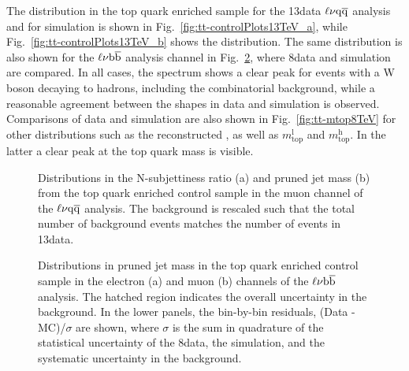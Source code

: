 The \mJ distribution in the top quark enriched sample for the 13\TeV data $\ell\nu\mathrm{q}\overline{\mathrm{q}}$ analysis and for simulation is shown in Fig.~\ref{fig:tt-controlPlots13TeV_a}, while Fig.~\ref{fig:tt-controlPlots13TeV_b} shows the \nsubj distribution.
The same distribution is also shown for the $\ell\nu{\mathrm{b}\overline{\mathrm{b}}}$ analysis channel in Fig.~\ref{fig:tt-controlPlots8TeV}, where 8\TeV data and simulation are compared.
In all cases, the \mJ spectrum shows a clear peak for events with a W boson decaying to hadrons, including the combinatorial background, while a reasonable agreement between the shapes in data and simulation is observed.
Comparisons of data and simulation are also shown in Fig.~\ref{fig:tt-mtop8TeV} for other distributions such as the reconstructed \mlvj, as well as $m_\mathrm{top}^\mathrm{l}$ and $m_\mathrm{top}^\mathrm{h}$.
In the latter a clear peak at the top quark mass is visible.

\begin{figure}[!htb]
\centering
{}
\caption{Distributions in the N-subjettiness ratio \nsubj (a) and pruned jet mass \mJ (b) from the top quark enriched control sample in the muon channel of the $\ell\nu\mathrm{q}\overline{\mathrm{q}}$ analysis. The \ttbar background is rescaled such that the total number of background events matches the number of events in 13\TeV data.}
\label{fig:tt-controlPlots13TeV}
\end{figure}

\begin{figure}[!htb]
\centering
{}
\caption{Distributions in pruned jet mass \mJ in the top quark enriched control sample in the electron (a) and muon (b) channels of the $\ell\nu{\mathrm{b}\overline{\mathrm{b}}}$ analysis. The hatched region indicates the overall uncertainty in the background. In the lower panels, the bin-by-bin residuals, (Data - MC)/$\sigma$ are shown, where $\sigma$ is the sum in quadrature of the statistical uncertainty of the 8\TeV data, the simulation, and the systematic uncertainty in the \ttbar background.}
\label{fig:tt-controlPlots8TeV}
\end{figure}


